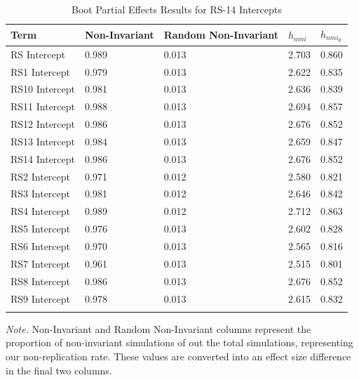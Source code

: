\documentclass[
  man]{apa7}
\begin{document}
\begin{table}[tbp]

\begin{center}
\begin{threeparttable}

\caption{\label{tab:table-boot-effects}Boot Partial Effects Results for RS-14 Intercepts}

\begin{tabular}{lllll}
\toprule
Term & Non-Invariant & Random Non-Invariant & $h_{nmi}$ & $h_{nmi_p}$\\
\midrule
RS  Intercept & 0.989 & 0.013 & 2.703 & 0.860\\
RS1  Intercept & 0.979 & 0.013 & 2.622 & 0.835\\
RS10  Intercept & 0.981 & 0.013 & 2.636 & 0.839\\
RS11  Intercept & 0.988 & 0.013 & 2.694 & 0.857\\
RS12  Intercept & 0.986 & 0.013 & 2.676 & 0.852\\
RS13  Intercept & 0.984 & 0.013 & 2.659 & 0.847\\
RS14  Intercept & 0.986 & 0.013 & 2.676 & 0.852\\
RS2  Intercept & 0.971 & 0.012 & 2.580 & 0.821\\
RS3  Intercept & 0.981 & 0.012 & 2.646 & 0.842\\
RS4  Intercept & 0.989 & 0.012 & 2.712 & 0.863\\
RS5  Intercept & 0.976 & 0.013 & 2.602 & 0.828\\
RS6  Intercept & 0.970 & 0.013 & 2.565 & 0.816\\
RS7  Intercept & 0.961 & 0.013 & 2.515 & 0.801\\
RS8  Intercept & 0.986 & 0.013 & 2.676 & 0.852\\
RS9  Intercept & 0.978 & 0.013 & 2.615 & 0.832\\
\bottomrule
\addlinespace
\end{tabular}

\begin{tablenotes}[para]
\normalsize{\textit{Note.} Non-Invariant and Random Non-Invariant columns represent the proportion of non-invariant simulations of out the total simulations, representing our non-replication rate. These values are converted into an effect size difference in the final two columns.}
\end{tablenotes}

\end{threeparttable}
\end{center}

\end{table}
\end{document}
